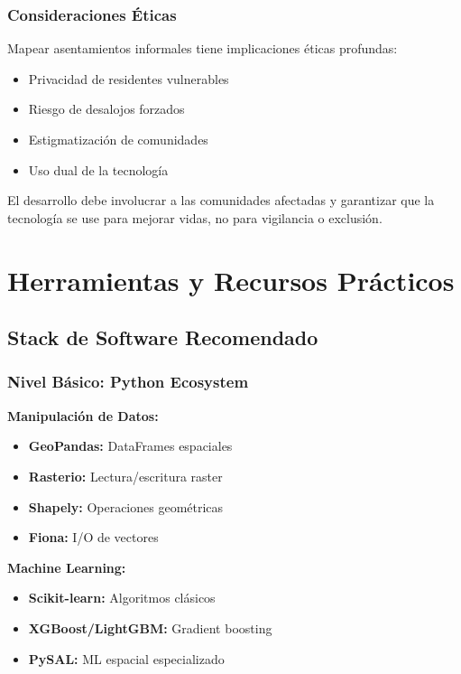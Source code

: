 \documentclass[12pt,a4paper]{article}
\begin{document}
\subsubsection{Consideraciones Éticas}

\begin{alertbox}
Mapear asentamientos informales tiene implicaciones éticas profundas:
\begin{itemize}
    \item Privacidad de residentes vulnerables
    \item Riesgo de desalojos forzados
    \item Estigmatización de comunidades
    \item Uso dual de la tecnología
\end{itemize}

El desarrollo debe involucrar a las comunidades afectadas y garantizar que la tecnología se use para mejorar vidas, no para vigilancia o exclusión.
\end{alertbox}

\section{Herramientas y Recursos Prácticos}

\subsection{Stack de Software Recomendado}

\subsubsection{Nivel Básico: Python Ecosystem}

\textbf{Manipulación de Datos:}
\begin{itemize}
    \item \textbf{GeoPandas:} DataFrames espaciales
    \item \textbf{Rasterio:} Lectura/escritura raster
    \item \textbf{Shapely:} Operaciones geométricas
    \item \textbf{Fiona:} I/O de vectores
\end{itemize}

\textbf{Machine Learning:}
\begin{itemize}
    \item \textbf{Scikit-learn:} Algoritmos clásicos
    \item \textbf{XGBoost/LightGBM:} Gradient boosting
    \item \textbf{PySAL:} ML espacial especializado
\end{itemize}
\end{document}
